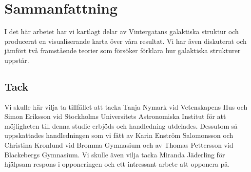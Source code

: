 \chapter{Sammanfattning}
I det här arbetet har vi kartlagt delar av Vintergatans galaktiska struktur och producerat en visualiserande karta över våra resultat. Vi har även diskuterat och jämfört två framstående teorier som försöker förklara hur galaktiska strukturer uppstår.

\section{Tack}
Vi skulle här vilja ta tillfället att tacka Tanja Nymark vid Vetenskapens Hus och Simon Eriksson vid Stockholms Universitets Astronomiska Institut för att möjligheten till denna studie erbjöds och handledning utdelades. Dessutom så uppskattades handledningen som vi fått av Karin Enström Salomonsson och Christina Kronlund vid Bromma Gymnasium och av Thomas Pettersson vid Blackebergs Gymnasium. Vi skulle även vilja tacka Miranda Jäderling för hjälpsam respons i opponeringen och ett intressant arbete att opponera på.